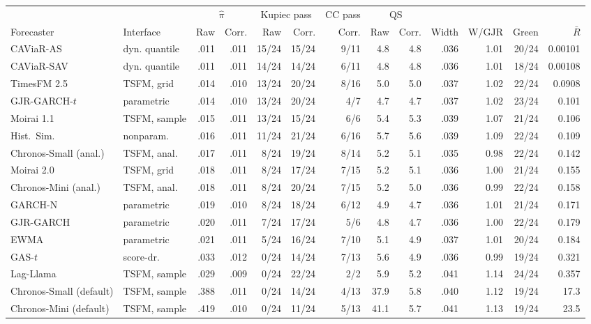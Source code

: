 \setlength{\tabcolsep}{1pt}
\begin{tabular}{@{}ll rr rr r rr rrr r@{}}
\toprule
& & \multicolumn{2}{c}{$\hat\pi$} & \multicolumn{2}{c}{Kupiec pass}
& CC pass & \multicolumn{2}{c}{QS} & & & & \\
\cmidrule(lr){3-4}\cmidrule(lr){5-6}\cmidrule(lr){8-9}
Forecaster & Interface & Raw & Corr. & Raw & Corr. & Corr.
& Raw & Corr. & Width & W/GJR & Green & $\bar{R}$ \\
\midrule
CAViaR-AS & dyn. quantile & .011 & .011 & 15/24 & 15/24 & 9/11 & 4.8 & 4.8 & .036 & 1.01 & 20/24 & 0.00101 \\
CAViaR-SAV & dyn. quantile & .011 & .011 & 14/24 & 14/24 & 6/11 & 4.8 & 4.8 & .036 & 1.01 & 18/24 & 0.00108 \\
TimesFM 2.5 & TSFM, grid & .014 & .010 & 13/24 & 20/24 & 8/16 & 5.0 & 5.0 & .037 & 1.02 & 22/24 & 0.0908 \\
GJR-GARCH-$t$ & parametric & .014 & .010 & 13/24 & 20/24 & 4/7 & 4.7 & 4.7 & .037 & 1.02 & 23/24 & 0.101 \\
Moirai 1.1 & TSFM, sample & .015 & .011 & 13/24 & 15/24 & 6/6 & 5.4 & 5.3 & .039 & 1.07 & 21/24 & 0.106 \\
Hist.\ Sim. & nonparam. & .016 & .011 & 11/24 & 21/24 & 6/16 & 5.7 & 5.6 & .039 & 1.09 & 22/24 & 0.109 \\
Chronos-Small (anal.) & TSFM, anal. & .017 & .011 & 8/24 & 19/24 & 8/14 & 5.2 & 5.1 & .035 & 0.98 & 22/24 & 0.142 \\
Moirai 2.0 & TSFM, grid & .018 & .011 & 8/24 & 17/24 & 7/15 & 5.2 & 5.1 & .036 & 1.00 & 21/24 & 0.155 \\
Chronos-Mini (anal.) & TSFM, anal. & .018 & .011 & 8/24 & 20/24 & 7/15 & 5.2 & 5.0 & .036 & 0.99 & 22/24 & 0.158 \\
GARCH-N & parametric & .019 & .010 & 8/24 & 18/24 & 6/12 & 4.9 & 4.7 & .036 & 1.01 & 21/24 & 0.171 \\
GJR-GARCH & parametric & .020 & .011 & 7/24 & 17/24 & 5/6 & 4.8 & 4.7 & .036 & 1.00 & 22/24 & 0.179 \\
EWMA & parametric & .021 & .011 & 5/24 & 16/24 & 7/10 & 5.1 & 4.9 & .037 & 1.01 & 20/24 & 0.184 \\
GAS-$t$ & score-dr. & .033 & .012 & 0/24 & 14/24 & 7/13 & 5.6 & 4.9 & .036 & 0.99 & 19/24 & 0.321 \\
Lag-Llama & TSFM, sample & .029 & .009 & 0/24 & 22/24 & 2/2 & 5.9 & 5.2 & .041 & 1.14 & 24/24 & 0.357 \\
Chronos-Small (default) & TSFM, sample & .388 & .011 & 0/24 & 14/24 & 4/13 & 37.9 & 5.8 & .040 & 1.12 & 19/24 & 17.3 \\
Chronos-Mini (default) & TSFM, sample & .419 & .010 & 0/24 & 11/24 & 5/13 & 41.1 & 5.7 & .041 & 1.13 & 19/24 & 23.5 \\
\bottomrule
\end{tabular}
